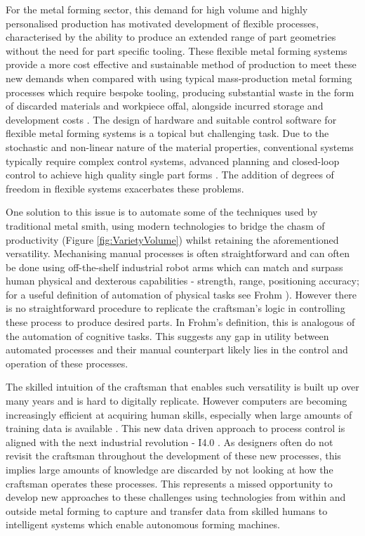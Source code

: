 For the metal forming sector, this demand for high volume and highly personalised production has motivated development of flexible processes, characterised by the ability to produce an extended range of part geometries without the need for part specific tooling. These flexible metal forming systems provide a more cost effective and sustainable method of production to meet these new demands when compared with using typical mass-production metal forming processes which require bespoke tooling, producing substantial waste in the form of discarded materials and workpiece offal, alongside incurred storage and development costs \citep{Cooper2017TheProcesses,Horton2019ImplementingComponents}. The design of hardware and suitable control software for flexible metal forming systems is a topical but challenging task. Due to the stochastic and non-linear nature of the material properties, conventional systems typically require complex control systems, advanced planning and closed-loop control to achieve high quality single part forms  \citep{Allwood2016Closed-loopForming, Tekkaya2015MetalProperties, Polyblank2014Closed-loopProspectus}. The addition of degrees of freedom in flexible systems exacerbates these problems. 

One solution to this issue is to automate some of the techniques used by traditional metal smith, using modern technologies to bridge the chasm of productivity (Figure \ref{fig:VarietyVolume}) whilst retaining the aforementioned versatility. Mechanising manual processes is often straightforward and can often be done using off-the-shelf industrial robot arms which can match and surpass human physical and dexterous capabilities - strength, range, positioning accuracy; for a useful definition of automation of physical tasks see Frohm \citep{Frohm2008LevelsManufacturing}). However there is no straightforward procedure to replicate the craftsman's logic in controlling these process to produce desired parts. In  Frohm's definition, this is analogous of the automation of cognitive tasks. This suggests any gap in utility between automated processes and their manual counterpart likely lies in the control and operation of these processes.

The skilled intuition of the craftsman that enables such versatility is built up over many years and is hard to digitally replicate. However computers are becoming increasingly efficient at acquiring human skills, especially when large amounts of training data is available \citep{Ford2016TheUnemployment}. This new data driven approach to process control is aligned with the next industrial revolution - I4.0 \citep{Zhong2017IntelligentReview}. %
As designers often do not revisit the craftsman throughout the development of these new processes, this implies large amounts of knowledge are discarded by not looking at how the craftsman operates these processes. This represents a missed opportunity to develop new approaches to these challenges using technologies from within and outside metal forming to capture and transfer data from skilled humans to intelligent systems which enable autonomous forming machines.

